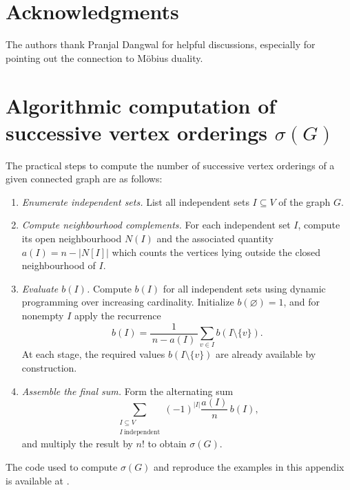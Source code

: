 \documentclass[11pt,a4paper]{article}
\numberwithin{equation}{section}
\theoremstyle{plain}
\theoremstyle{definition}
\theoremstyle{remark}
\begin{document}
\section*{Acknowledgments}
The authors thank Pranjal Dangwal for helpful discussions, especially for pointing out the connection to Möbius duality.

\clearpage
\appendix

\section{Algorithmic computation of successive vertex orderings \(\sigma(G)\)}
\label{appendix:algorithm}

\renewcommand{\thefigure}{A\arabic{figure}}
\renewcommand{\thetable}{A\arabic{table}}

\setcounter{figure}{0}
\setcounter{table}{0}

The practical steps to compute the number of successive vertex orderings of a given connected graph are as follows:

\begin{enumerate}
\item \emph{Enumerate independent sets.}
List all independent sets \(I\subseteq V\) of the graph \(G\). 

\item \emph{Compute neighbourhood complements.}
For each independent set \(I\), compute its open neighbourhood \(N(I)\) and the associated quantity \(a(I)=n-|N[I]|\) which counts the vertices lying outside the closed neighbourhood of \(I\).

\item \emph{Evaluate \(b(I)\).}
Compute \(b(I)\) for all independent sets using dynamic programming over increasing cardinality. Initialize \(b(\varnothing)=1\), and for nonempty \(I\) apply the recurrence
\[
b(I)=\frac{1}{\,n-a(I)\,}\sum_{v\in I} b(I\setminus\{v\}).
\]
At each stage, the required values \(b(I\setminus\{v\})\) are already available by construction.

\item \emph{Assemble the final sum.}
Form the alternating sum
\[
\sum_{\substack{I\subseteq V\\ I\ \mathrm{independent}}}
(-1)^{|I|}\frac{a(I)}{n}\,b(I),
\]
and multiply the result by \(n!\) to obtain \(\sigma(G)\). 
\end{enumerate}
 
The code used to compute $\sigma(G)$ and reproduce the examples in this appendix is available at \cite{svocode2026}.
\end{document}
